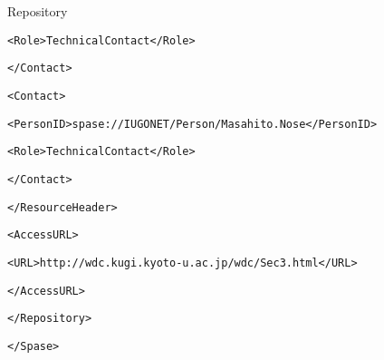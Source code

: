 \begin{itembox}[1]{Repository}
{\begin{alltt}
        <Role>TechnicalContact</Role>
  		
      </Contact>
  		
      <Contact>
		
        <PersonID>spase://IUGONET/Person/Masahito.Nose</PersonID>
  			
        <Role>TechnicalContact</Role>
  		
      </Contact>
  	
    </ResourceHeader>
  	
    <AccessURL>
  		
      <URL>http://wdc.kugi.kyoto-u.ac.jp/wdc/Sec3.html</URL>
  	
    </AccessURL>
  
  </Repository>
  

</Spase>

\end{alltt}
}
\end{itembox}

